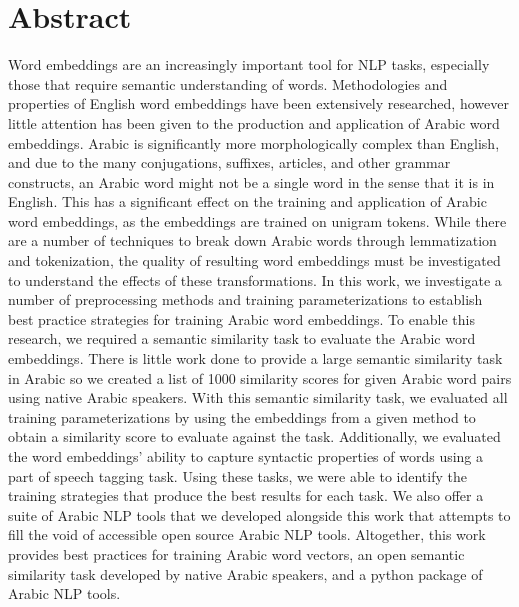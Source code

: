 \section*{Abstract}

Word embeddings are an increasingly important tool for NLP tasks, especially those that require semantic understanding of words.
Methodologies and properties of English word embeddings have been extensively researched, however little attention has been given to the production and application of Arabic word embeddings.
Arabic is significantly more morphologically complex than English, and due to the many conjugations, suffixes, articles, and other grammar constructs, an Arabic word might not be a single word in the sense that it is in English.
This has a significant effect on the training and application of Arabic word embeddings, as the embeddings are trained on unigram tokens.
While there are a number of techniques to break down Arabic words through lemmatization and tokenization, the quality of resulting word embeddings must be investigated to understand the effects of these transformations.
In this work, we investigate a number of preprocessing methods and training parameterizations to establish best practice strategies for training Arabic word embeddings.
To enable this research, we required a semantic similarity task to evaluate the Arabic word embeddings.
There is little work done to provide a large semantic similarity task in Arabic so we created a list of 1000 similarity scores for given Arabic word pairs using native Arabic speakers.
With this semantic similarity task, we evaluated all training parameterizations by using the embeddings from a given method to obtain a similarity score to evaluate against the task.
Additionally, we evaluated the word embeddings' ability to capture syntactic properties of words using a part of speech tagging task.
Using these tasks, we were able to identify the training strategies that produce the best results for each task.
We also offer a suite of Arabic NLP tools that we developed alongside this work that attempts to fill the void of accessible open source Arabic NLP tools.
Altogether, this work provides best practices for training Arabic word vectors, an open semantic similarity task developed by native Arabic speakers, and a python package of Arabic NLP tools.